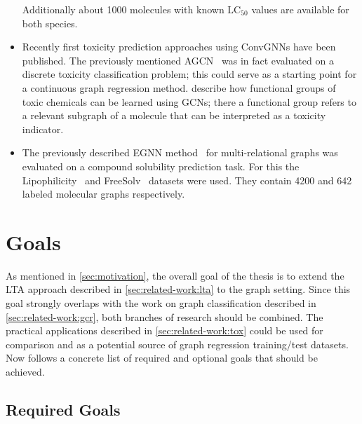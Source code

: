 \documentclass[12pt]{scrartcl}
\begin{document}
\begin{itemize}
		Additionally about 1000 molecules with known $\text{LC}_{50}$ values are available for both species.
	\item Recently first toxicity prediction approaches using ConvGNNs have been published.
		The previously mentioned AGCN~\cite{Li2018} was in fact evaluated on a discrete toxicity classification problem;
		this could serve as a starting point for a continuous graph regression method.
		\citet{Pope2018} describe how functional groups of toxic chemicals can be learned using GCNs;
		there a functional group refers to a relevant subgraph of a molecule that can be interpreted as a toxicity indicator.
	\item The previously described EGNN method~\cite{Gong2018} for multi-relational graphs was evaluated on a compound solubility prediction task.
		For this the Lipophilicity~\cite{Wu2017} and FreeSolv~\cite{Mobley2014} datasets were used.
		They contain 4200 and 642 labeled molecular graphs respectively.
\end{itemize}

\section{Goals}%
\label{sec:goals}

As mentioned in \cref{sec:motivation}, the overall goal of the thesis is to extend the LTA approach described in \cref{sec:related-work:lta} to the graph setting.
Since this goal strongly overlaps with the work on graph classification described in \cref{sec:related-work:gcr}, both branches of research should be combined.
The practical applications described in \cref{sec:related-work:tox} could be used for comparison and as a potential source of graph regression training/test datasets.
Now follows a concrete list of required and optional goals that should be achieved.

\subsection{Required Goals}%
\label{sec:goals:req}
\end{document}
